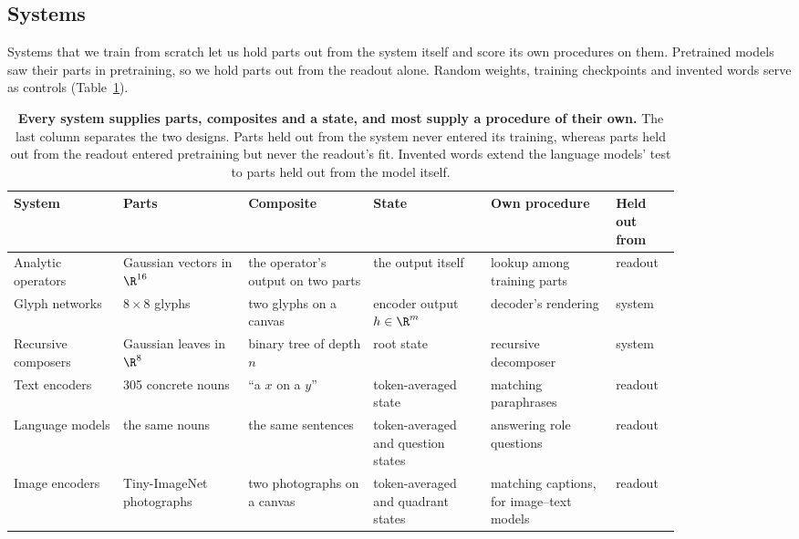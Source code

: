 \subsection{Systems}

Systems that we train from scratch let us hold parts out from the system itself and score its own procedures on them. Pretrained models saw their parts in pretraining, so we hold parts out from the readout alone. Random weights, training checkpoints and invented words serve as controls (Table~\ref{tab:systems}).

\begin{table}[t]
  \centering
  \small
  \caption{\textbf{Every system supplies parts, composites and a state, and most supply a procedure of their own.} The last column separates the two designs. Parts held out from the system never entered its training, whereas parts held out from the readout entered pretraining but never the readout's fit. Invented words extend the language models' test to parts held out from the model itself.}
  \label{tab:systems}
  \begin{tabular}{@{}p{0.14\linewidth}p{0.16\linewidth}p{0.16\linewidth}p{0.15\linewidth}p{0.16\linewidth}p{0.08\linewidth}@{}}
    \toprule
    System & Parts & Composite & State & Own procedure & Held out from \\
    \midrule
    Analytic operators & Gaussian vectors in $\R^{16}$ & the operator's output on two parts & the output itself & lookup among training parts & readout \\
    Glyph networks & $8 \times 8$ glyphs & two glyphs on a canvas & encoder output $h \in \R^m$ & decoder's rendering & system \\
    Recursive composers & Gaussian leaves in $\R^8$ & binary tree of depth $n$ & root state & recursive decomposer & system \\
    Text encoders & 305 concrete nouns & ``a $x$ on a $y$'' & token-averaged state & matching paraphrases & readout \\
    Language models & the same nouns & the same sentences & token-averaged and question states & answering role questions & readout \\
    Image encoders & Tiny-ImageNet photographs & two photographs on a canvas & token-averaged and quadrant states & matching captions, for image--text models & readout \\
    \bottomrule
  \end{tabular}
\end{table}

